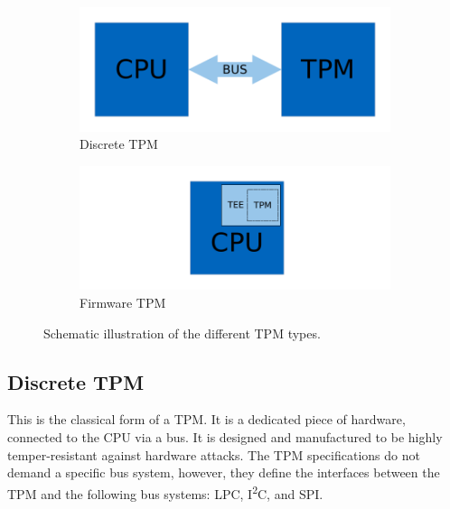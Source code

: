 \begin{figure}
    \begin{subfigure}{0.49\textwidth}
      \includegraphics[width=\linewidth]{figures/dTPM.pdf}
      \caption{Discrete TPM} \label{fig:dtpm}
    \end{subfigure}%
    \hspace*{\fill}   %
    \begin{subfigure}{0.49\textwidth}
      \includegraphics[width=\linewidth]{figures/fTPM.pdf}
      \caption{Firmware TPM} \label{fig:ftpm}
    \end{subfigure}%
  
  \caption{Schematic illustration of the different TPM types.} \label{fig:tpm_types}
  \end{figure}

\subsection{Discrete TPM}

This is the classical form of a TPM. It is a dedicated piece of hardware, connected to the CPU via a bus. It is designed and manufactured to be highly temper-resistant against hardware attacks.
The TPM specifications \cite{tpm, tcgPcClient} do not demand a specific bus system, however, they define the interfaces between the TPM and the following bus systems: LPC, I\textsuperscript{2}C, and SPI.

